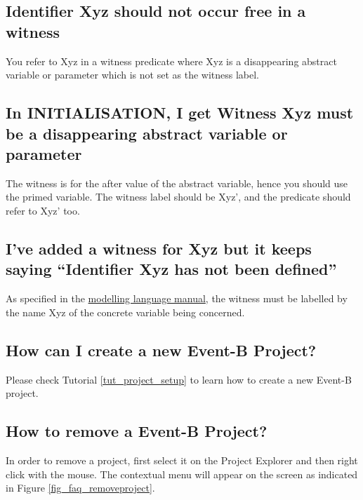\subsection{Identifier \textsf{Xyz} should not occur free in a witness}

You refer to \textsf{Xyz} in a witness predicate where \textsf{Xyz} is a disappearing abstract variable or parameter which is not set as the witness label. 

\subsection{In \textsf{INITIALISATION}, I get Witness \textsf{Xyz} must be a disappearing abstract variable or parameter}

The witness is for the after value of the abstract variable, hence you should use the primed variable. The witness label should be \textsf{Xyz'}, and the predicate should refer to \textsf{Xyz'} too. 

\subsection{I've added a witness for \textsf{Xyz} but it keeps saying ``Identifier \textsf{Xyz} has not been defined''}

As specified in the \href{http://wiki.event-b.org/index.php/Witnesses_(Modelling_Language)}{modelling language manual}, the witness must be labelled by the name \textsf{Xyz} of the concrete variable being concerned.

\subsection{How can I create a new Event-B Project?}

Please check Tutorial \ref{tut_project_setup} to learn how to create a new Event-B project.

\subsection{How to remove a Event-B Project?}

In order to remove a project, first select it on the \textsf{Project Explorer} and then right click with the mouse. The contextual menu will appear on the screen as indicated in Figure \ref{fig_faq_removeproject}.

